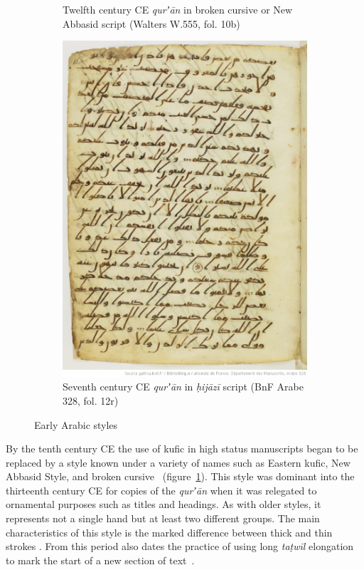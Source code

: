 \begin{figure}[h!tp]
\begin{subfigure}[t]{.48\textwidth}
		\caption{Twelfth century CE \emph{qurʼān} in broken cursive or New Abbasid script (Walters W.555, fol. 10b)}
                \label{fig:ara_broken}
        \end{subfigure}
	\hfill
	\begin{subfigure}[t]{.48\columnwidth}
                \includegraphics[width=\textwidth]{images/Coran__btv1b8415207g_31.jpeg}
		\caption{Seventh century CE \emph{qurʼān} in \emph{ḥijāzī} script (BnF Arabe 328, fol. 12r)}
                \label{fig:ara_hijazi}
        \end{subfigure}
        \caption{Early Arabic styles}
\end{figure}

By the tenth century CE the use of kufic in high status manuscripts began to be
replaced by a style known under a variety of names such as Eastern kufic, New
Abbasid Style, and broken cursive~\cite[pg. 144]{blair2006islamic}
(figure~\ref{fig:ara_broken}). This style was dominant into the thirteenth
century CE for copies of the \emph{qurʼān} when it was relegated to ornamental
purposes such as titles and headings. As with older styles, it represents not a
single hand but at least two different groups. The main characteristics of this
style is the marked difference between thick and thin strokes \cite[pg.
167-168]{gacek2009arabic}. From this period also dates the practice of using
long \emph{taṭwīl} elongation to mark the start of a new section of
text~\cite[pg. 165]{blair2006islamic}.

